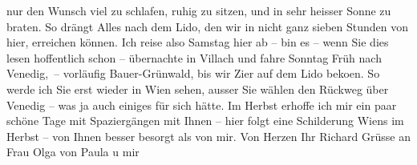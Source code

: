 \begin{ledgroupsized}[t]{13cm}
               nur den Wunsch viel zu schlafen, ruhig zu sitzen, und in sehr heisser Sonne zu
               braten. So drängt Alles nach dem Lido, den wir in
               nicht ganz sieben Stunden von hier, erreichen können.\pend
           \pstart
           {\pb}Ich reise also Samstag hier ab –
               bin es – wenn Sie dies lesen hoffentlich schon – übernachte in Villach und fahre Sonntag Früh nach Venedig, – vorläufig Bauer-Grünwald, bis wir Zi{\geminationm}er auf dem Lido beko{\geminationm}en. So
               werde ich Sie erst wieder in Wien sehen, ausser
               Sie wählen den Rückweg über Venedig – was ja auch
               einiges für sich hätte. Im Herbst erhoffe ich mir  ein paar schöne Tage mit Spaziergängen mit Ihnen –
               hier folgt eine Schilderung Wiens im Herbst – von
               Ihnen besser besorgt als von mir. Von Herzen\pend
           \pstart Ihr \spacefill\mbox{Richard}\pend{}\pstart
           Grüsse an Frau Olga von Paula u mir\pend
           
         
         \endnumbering{}\end{ledgroupsized}  \newcommand{\dateiname}{L01703}\newcommand{\titel}{Richard Beer-Hofmann an Arthur Schnitzler, 29. 8. 1907}\newcommand{\editorInnen}{Martin Anton Müller und Gerd-Hermann Susen}
      